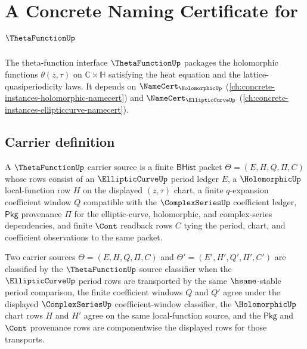 \chapter{A Concrete Naming Certificate for $\ThetaFunctionUp$}
\label{ch:concrete-instances-thetafunction-namecert}

The theta-function interface $\ThetaFunctionUp$ packages the holomorphic functions $\theta(z, \tau)$ on $\mathbb{C} \times \mathbb{H}$ satisfying the heat equation and the lattice-quasiperiodicity laws. It depends on $\NameCert_{\HolomorphicUp}$ (\autoref{ch:concrete-instances-holomorphic-namecert}) and $\NameCert_{\EllipticCurveUp}$ (\autoref{ch:concrete-instances-ellipticcurve-namecert}).

\section{Carrier definition}
\label{sec:thetafunction-carrier}

\begin{definition}
\label{def:thetafunction-carrier-source}
A $\ThetaFunctionUp$ carrier source is a finite $\mathsf{BHist}$ packet
$\Theta=(E,H,Q,\Pi,C)$ whose rows consist of an $\EllipticCurveUp$ period
ledger $E$, a $\HolomorphicUp$ local-function row $H$ on the displayed
$(z,\tau)$ chart, a finite $q$-expansion coefficient window $Q$ compatible with
the $\ComplexSeriesUp$ coefficient ledger, $\mathsf{Pkg}$ provenance $\Pi$ for
the elliptic-curve, holomorphic, and complex-series dependencies, and finite
$\Cont$ readback rows $C$ tying the period, chart, and coefficient observations
to the same packet.
\end{definition}

\begin{definition}
\label{def:thetafunction-classifier}
Two carrier sources $\Theta=(E,H,Q,\Pi,C)$ and
$\Theta'=(E',H',Q',\Pi',C')$ are classified by the $\ThetaFunctionUp$ source
classifier when the $\EllipticCurveUp$ period rows are transported by the same
$\hsame$-stable period comparison, the finite coefficient windows $Q$ and
$Q'$ agree under the displayed $\ComplexSeriesUp$ coefficient-window
classifier, the $\HolomorphicUp$ chart rows $H$ and $H'$ agree on the same
local-function source, and the $\mathsf{Pkg}$ and $\Cont$ provenance rows are
componentwise the displayed rows for those transports.
\end{definition}

